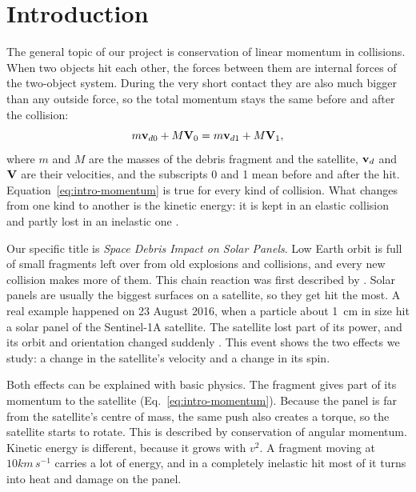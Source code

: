\newpage
\section{Introduction}
\label{sec:introduction}

The general topic of our project is conservation of linear momentum in
collisions. When two objects hit each other, the forces between them are
internal forces of the two-object system. During the very short contact
they are also much bigger than any outside force, so the total momentum
stays the same before and after the collision:
\begin{equation}
  m\mathbf{v}_{d0}+M\mathbf{V}_0 = m\mathbf{v}_{d1}+M\mathbf{V}_1 ,
  \label{eq:intro-momentum}
\end{equation}
where $m$ and $M$ are the masses of the debris fragment and the satellite,
$\mathbf{v}_d$ and $\mathbf{V}$ are their velocities, and the subscripts 0 and 1
mean before and after the hit. Equation~\eqref{eq:intro-momentum} is true
for every kind of collision. What changes from one kind to another is the
kinetic energy: it is kept in an elastic collision and partly lost in an
inelastic one \citep{halliday2014, ling2016}.

Our specific title is \textit{Space Debris Impact on Solar Panels}. Low
Earth orbit is full of small fragments left over from old explosions and
collisions, and every new collision makes more of them. This chain
reaction was first described by \citet{kessler1978}. Solar panels are
usually the biggest surfaces on a satellite, so they get hit the most. A
real example happened on 23 August 2016, when a particle about 1~cm in
size hit a solar panel of the Sentinel-1A satellite. The satellite lost
part of its power, and its orbit and orientation changed suddenly
\citep{krag2017}. This event shows the two effects we study: a change in
the satellite's velocity and a change in its spin.

Both effects can be explained with basic physics. The fragment gives part
of its momentum to the satellite (Eq.~\eqref{eq:intro-momentum}). Because
the panel is far from the satellite's centre of mass, the same push also
creates a torque, so the satellite starts to rotate. This is described by
conservation of angular momentum. Kinetic energy is different, because it
grows with $v^2$. A fragment moving at $10\unit{km\,s^{-1}}$ carries a lot
of energy, and in a completely inelastic hit most of it turns into heat
and damage on the panel.

